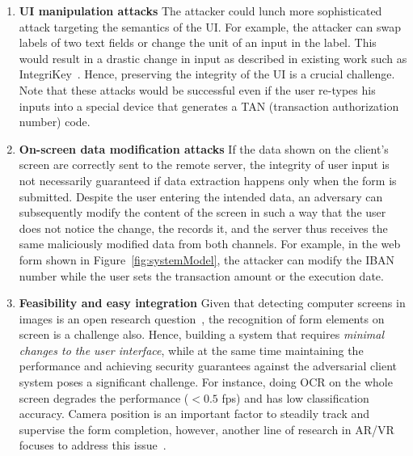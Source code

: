 \begin{enumerate}

\item \textbf{UI manipulation attacks}
The attacker could lunch more sophisticated attack targeting the semantics of the UI. For example, the attacker can swap labels of two text fields or change the unit of an input in the label. This would result in a drastic change in input as described in existing work such as IntegriKey~\cite{integrikey}. Hence, preserving the integrity of the UI is a crucial challenge. Note that these attacks would be successful even if the user re-types his inputs into a special device that generates a TAN (transaction authorization number) code.


\item \textbf{On-screen data modification attacks}
If the data shown on the client's screen are correctly sent to the remote server, the integrity of user input is not necessarily guaranteed if data extraction happens only when the form is submitted.
Despite the user entering the intended data, an adversary can subsequently modify the content of the screen in such a way that the user does not notice the change, the \app records it, and the server thus receives the same maliciously modified data from both channels. For example, in the web form shown in Figure~\ref{fig:systemModel}, the attacker can modify the IBAN number while the user sets the transaction amount or the execution date. 

 

\item \textbf{Feasibility and easy integration}
Given that detecting computer screens in images is an open research question~\cite{detectingScreens}, the recognition of form elements on screen is a challenge also. Hence, building a system that requires \emph{minimal changes to the user interface}, while at the same time maintaining the performance and achieving security guarantees against the adversarial client system poses a significant challenge. For instance, doing OCR on the whole screen degrades the performance ($<0.5$ fps) and has low classification accuracy. Camera position is an important factor to steadily track and supervise the form completion, however, another line of research in AR/VR focuses to address this issue~\cite{objectDetectionMobicom19, objectDetectionNIPS15, objectDetectionBD18}.

\end{enumerate}

